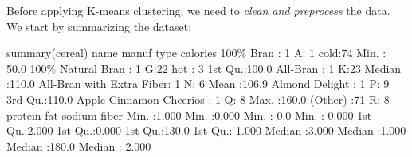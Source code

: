 \documentclass[
  11pt,
]{book}
\makeatletter
\newenvironment{Shaded}{}{}
\newcommand{\DecValTok}[1]{#1}
\newcommand{\FloatTok}[1]{#1}
\newcommand{\FunctionTok}[1]{#1}
\newcommand{\NormalTok}[1]{#1}
\newcommand{\SpecialCharTok}[1]{\textcolor[rgb]{0.39,0.39,0.39}{#1}}
\newenvironment{kframe}{%
\medskip{}
\setlength{\fboxsep}{.8em}
 \def\at@end@of@kframe{}%
 \ifinner\ifhmode%
  \def\at@end@of@kframe{\end{minipage}}%
  \begin{minipage}{\columnwidth}%
 \fi\fi%
 \def\FrameCommand##1{\hskip\@totalleftmargin \hskip-\fboxsep
 \colorbox{shadecolor}{##1}\hskip-\fboxsep
     \hskip-\linewidth \hskip-\@totalleftmargin \hskip\columnwidth}%
 \MakeFramed {\advance\hsize-\width
   \@totalleftmargin\z@ \linewidth\hsize
   \@setminipage}}%
 {\par\unskip\endMakeFramed%
 \at@end@of@kframe}
\renewenvironment{Shaded}{\begin{kframe}}{\end{kframe}}
\theoremstyle{definition}
\theoremstyle{definition}
\theoremstyle{definition}
\theoremstyle{definition}
\theoremstyle{remark}
\makeatother
\begin{document}
Before applying K-means clustering, we need to \emph{clean and preprocess} the data. We start by summarizing the dataset:

\begin{Shaded}
\begin{Highlighting}[]
\FunctionTok{summary}\NormalTok{(cereal)}
\NormalTok{                           name    manuf    type       calories    }
    \DecValTok{100}\NormalTok{\% Bran                }\SpecialCharTok{:} \DecValTok{1}\NormalTok{   A}\SpecialCharTok{:} \DecValTok{1}\NormalTok{   cold}\SpecialCharTok{:}\DecValTok{74}\NormalTok{   Min.   }\SpecialCharTok{:} \FloatTok{50.0}  
    \DecValTok{100}\NormalTok{\% Natural Bran        }\SpecialCharTok{:} \DecValTok{1}\NormalTok{   G}\SpecialCharTok{:}\DecValTok{22}\NormalTok{   hot }\SpecialCharTok{:} \DecValTok{3}   \DecValTok{1}\NormalTok{st Qu.}\SpecialCharTok{:}\FloatTok{100.0}  
\NormalTok{    All}\SpecialCharTok{{-}}\NormalTok{Bran                 }\SpecialCharTok{:} \DecValTok{1}\NormalTok{   K}\SpecialCharTok{:}\DecValTok{23}\NormalTok{             Median }\SpecialCharTok{:}\FloatTok{110.0}  
\NormalTok{    All}\SpecialCharTok{{-}}\NormalTok{Bran with Extra Fiber}\SpecialCharTok{:} \DecValTok{1}\NormalTok{   N}\SpecialCharTok{:} \DecValTok{6}\NormalTok{             Mean   }\SpecialCharTok{:}\FloatTok{106.9}  
\NormalTok{    Almond Delight           }\SpecialCharTok{:} \DecValTok{1}\NormalTok{   P}\SpecialCharTok{:} \DecValTok{9}             \DecValTok{3}\NormalTok{rd Qu.}\SpecialCharTok{:}\FloatTok{110.0}  
\NormalTok{    Apple Cinnamon Cheerios  }\SpecialCharTok{:} \DecValTok{1}\NormalTok{   Q}\SpecialCharTok{:} \DecValTok{8}\NormalTok{             Max.   }\SpecialCharTok{:}\FloatTok{160.0}  
\NormalTok{    (Other)                  }\SpecialCharTok{:}\DecValTok{71}\NormalTok{   R}\SpecialCharTok{:} \DecValTok{8}                            
\NormalTok{       protein           fat            sodium          fiber       }
\NormalTok{    Min.   }\SpecialCharTok{:}\FloatTok{1.000}\NormalTok{   Min.   }\SpecialCharTok{:}\FloatTok{0.000}\NormalTok{   Min.   }\SpecialCharTok{:}  \FloatTok{0.0}\NormalTok{   Min.   }\SpecialCharTok{:} \FloatTok{0.000}  
    \DecValTok{1}\NormalTok{st Qu.}\SpecialCharTok{:}\FloatTok{2.000}   \DecValTok{1}\NormalTok{st Qu.}\SpecialCharTok{:}\FloatTok{0.000}   \DecValTok{1}\NormalTok{st Qu.}\SpecialCharTok{:}\FloatTok{130.0}   \DecValTok{1}\NormalTok{st Qu.}\SpecialCharTok{:} \FloatTok{1.000}  
\NormalTok{    Median }\SpecialCharTok{:}\FloatTok{3.000}\NormalTok{   Median }\SpecialCharTok{:}\FloatTok{1.000}\NormalTok{   Median }\SpecialCharTok{:}\FloatTok{180.0}\NormalTok{   Median }\SpecialCharTok{:} \FloatTok{2.000}  

\end{Highlighting}
\end{Shaded}
\end{document}
